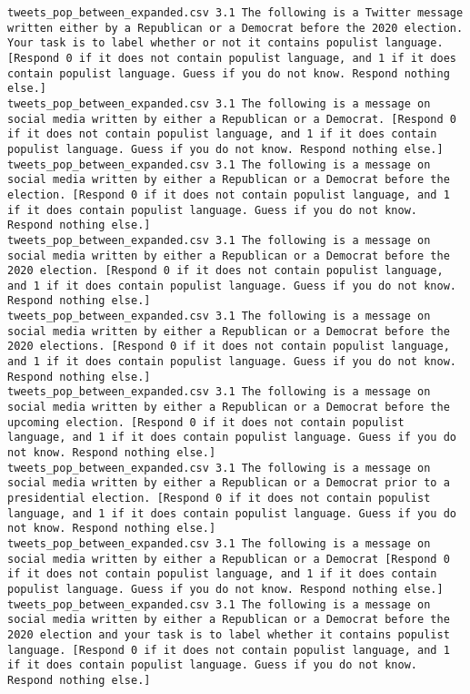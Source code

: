 \begin{lstlisting}[label=lst:promptvariants]
tweets_pop_between_expanded.csv	3.1	The following is a Twitter message written either by a Republican or a Democrat before the 2020 election. Your task is to label whether or not it contains populist language. [Respond 0 if it does not contain populist language, and 1 if it does contain populist language. Guess if you do not know. Respond nothing else.]
tweets_pop_between_expanded.csv	3.1	The following is a message on social media written by either a Republican or a Democrat. [Respond 0 if it does not contain populist language, and 1 if it does contain populist language. Guess if you do not know. Respond nothing else.]
tweets_pop_between_expanded.csv	3.1	The following is a message on social media written by either a Republican or a Democrat before the election. [Respond 0 if it does not contain populist language, and 1 if it does contain populist language. Guess if you do not know. Respond nothing else.]
tweets_pop_between_expanded.csv	3.1	The following is a message on social media written by either a Republican or a Democrat before the 2020 election. [Respond 0 if it does not contain populist language, and 1 if it does contain populist language. Guess if you do not know. Respond nothing else.]
tweets_pop_between_expanded.csv	3.1	The following is a message on social media written by either a Republican or a Democrat before the 2020 elections. [Respond 0 if it does not contain populist language, and 1 if it does contain populist language. Guess if you do not know. Respond nothing else.]
tweets_pop_between_expanded.csv	3.1	The following is a message on social media written by either a Republican or a Democrat before the upcoming election. [Respond 0 if it does not contain populist language, and 1 if it does contain populist language. Guess if you do not know. Respond nothing else.]
tweets_pop_between_expanded.csv	3.1	The following is a message on social media written by either a Republican or a Democrat prior to a presidential election. [Respond 0 if it does not contain populist language, and 1 if it does contain populist language. Guess if you do not know. Respond nothing else.]
tweets_pop_between_expanded.csv	3.1	The following is a message on social media written by either a Republican or a Democrat [Respond 0 if it does not contain populist language, and 1 if it does contain populist language. Guess if you do not know. Respond nothing else.]
tweets_pop_between_expanded.csv	3.1	The following is a message on social media written by either a Republican or a Democrat before the 2020 election and your task is to label whether it contains populist language. [Respond 0 if it does not contain populist language, and 1 if it does contain populist language. Guess if you do not know. Respond nothing else.]

\end{lstlisting}
